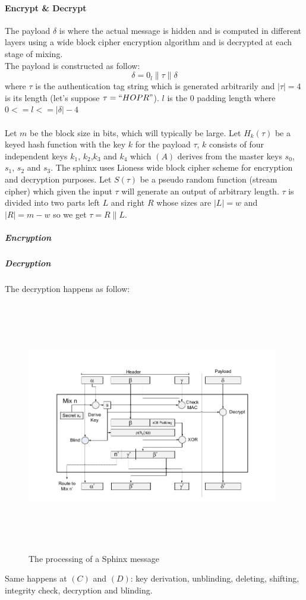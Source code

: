 \paragraph{Encrypt \& Decrypt}
The payload $\delta$ is where the actual message is hidden and is computed in different layers using a wide block cipher encryption algorithm and is decrypted at each stage of mixing.
\\The payload is constructed as follow:
$$\delta= 0_{l} \|\tau\|\delta$$ where $\tau$ is the authentication tag string which is generated arbitrarily and $|\tau|=4$ is its length (let's suppose $\tau=``HOPR "$). $l$ is the $0$ padding length where
$0 <= l <= |\delta| - 4$
\\~\\Let $m$ be the block size in bits, which will typically be large. Let $H_k(\tau)$ be a keyed hash function with the key $k$ for the payload $\tau$, $k$ consists of four independent keys $k_1$, $k_2$,$k_3$ and $k_4$ which $(A)$ derives from the master keys $s_0$, $s_1$, $s_2$ and $s_3$. The sphinx uses Lioness wide block cipher scheme for encryption and decryption purposes.
Let $S(\tau)$ be a pseudo random function (stream cipher) which given the input $\tau$ will generate an output of arbitrary length. $\tau$ is divided into two parts left $L$ and right $R$ whose sizes are $|L|=w$ and $|R|=m-w$ so we get $\tau=R\|L$.
\subparagraph{Encryption}
\subparagraph{Decryption} The decryption happens as follow:
\begin{figure}[H]
    \centering
    \includegraphics[width=11cm,height=11cm,keepaspectratio]{../yellowpaper/images/sphinx1.png}
    \caption{The processing of a Sphinx message}
    \label{fig:The processing of a Sphinx message }
\end{figure}
\hspace{-5mm}Same happens at $(C)$ and $(D)$: key derivation, unblinding, deleting, shifting, integrity check, decryption and blinding.

